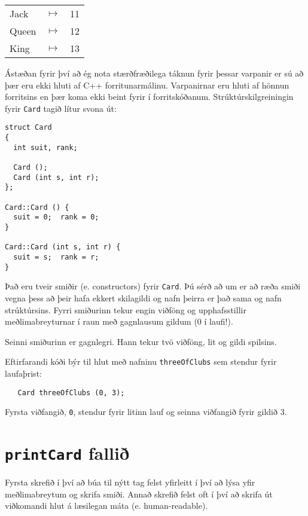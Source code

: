 \vspace{0.1in}
\begin{tabular}{l c l}
Jack & $\mapsto$ & 11 \\
Queen & $\mapsto$ & 12 \\
King & $\mapsto$ & 13 \\
\end{tabular}
\vspace{0.1in}

Ástæðan fyrir því að ég nota stærðfræðilega táknun fyrir þessar varpanir er sú að þær eru ekki hluti af C++ forritunarmálinu.
Varpanirnar eru hluti af hönnun forritsins en þær koma ekki beint fyrir í forritskóðanum.
Strúktúrskilgreiningin fyrir {\tt Card} tagið lítur svona út:

\begin{verbatim}
struct Card
{
  int suit, rank;

  Card ();
  Card (int s, int r);
};

Card::Card () { 
  suit = 0;  rank = 0;
}

Card::Card (int s, int r) { 
  suit = s;  rank = r;
}
\end{verbatim}
%
Það eru tveir smiðir (e. constructors) fyrir {\tt Card}.
Þú sérð að um er að ræða smiði vegna þess að þeir hafa ekkert skilagildi og nafn þeirra er það sama og nafn strúktúrsins.
Fyrri smiðurinn tekur engin viðföng og upphafsstillir meðlimabreyturnar í raun með gagnlausum gildum (0 í laufi!).

Seinni smiðurinn er gagnlegri.
Hann tekur tvö viðföng, lit og gildi spilsins.


Eftirfarandi kóði býr til hlut með nafninu {\tt threeOfClubs} sem stendur fyrir laufaþrist: 

\begin{verbatim}
   Card threeOfClubs (0, 3);
\end{verbatim}
%
Fyrsta viðfangið, {\tt 0}, stendur fyrir litinn lauf og seinna viðfangið fyrir gildið 3.

\section{{\tt printCard} fallið}

Fyrsta skrefið í því að búa til nýtt tag felst yfirleitt í því að lýsa yfir meðlimabreytum og skrifa smiði.
Annað skrefið felst oft í því að skrifa út viðkomandi hlut á læsilegan máta (e. human-readable).

